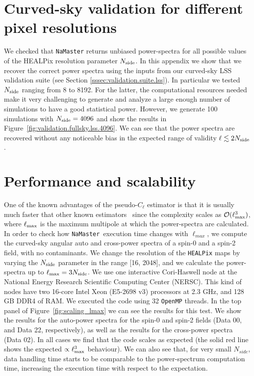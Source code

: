 \documentclass[usenatbib]{mnrasb}
\newcommand{\nmt}{{\tt NaMaster}}
\begin{document}
  \section{Curved-sky validation for different pixel resolutions}\label{app:full_sky_nside}
    We checked that \texttt{NaMaster} returns unbiased power-spectra for all possible values of the HEALPix resolution parameter $N_{\rm side}$. In this appendix we show that we recover the correct power spectra using the inputs from our curved-sky LSS validation suite (see Section \ref{sssec:validation.suite.lss}). In particular we tested $N_{\rm side}$ ranging from 8 to 8192. For the latter, the computational resources needed make it very challenging to generate and analyze a large enough number of simulations to have a good statistical power. However, we generate 100 simulations with $N_{\rm side}=4096$ and show the results in Figure~\ref{fig:validation.fullsky.lss.4096}. We can see that the power spectra are recovered without any noticeable bias in the expected range of validity $\ell \lesssim 2 N_{\rm side}$.
    
 \section{Performance and scalability}\label{app:scalability}
     One of the known advantages of the pseudo-$C_{\ell}$ estimator is that it is usually much faster that other known estimators~\citep{2017MNRAS.465.1847E} since the complexity scales as $\mathcal{O}(\ell_{\rm max}^{3})$, where $\ell_{\rm max}$ is the maximum multipole at which the power-spectra are calculated. In order to check how \nmt\, execution time changes with $\ell_{max}$, we compute the curved-sky angular auto and cross-power spectra of a spin-0 and a spin-2 field, with no contaminants. We change the resolution of the \texttt{HEALPix} maps by varying the $N_{\rm side}$ parameter in the range [16, 2048], and we calculate the power-spectra up to $\ell_{\rm max}=3N_{\rm side}$. We use one interactive Cori-Haswell node at the National Energy Research Scientific Computing Center (NERSC). This kind of nodes have two 16-core Intel Xeon (E5-2698 v3) processors at 2.3 GHz, and 128 GB DDR4 of RAM. We executed the code using 32 \texttt{OpenMP} threads. In the top panel of Figure~\ref{fig:scaling_lmax} we can see the results for this test. We show the results for the auto-power spectra for the spin-0 and spin-2 fields (Data 00, and Data 22, respectively), as well as the results for the cross-power spectra (Data 02). In all cases we find that the code scales as expected (the solid red line shows the expected $\propto\ell_{\rm max}^3$ behaviour). We can also see that, for very small $N_{side}$, data handling time starts to be comparable to the power-spectrum computation time, increasing the execution time with respect to the expectation.
     
\end{document}
